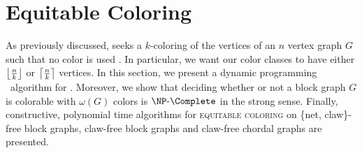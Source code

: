 \section{Equitable Coloring}

As previously discussed,  seeks a $k$-coloring of the vertices of an $n$ vertex graph $G$ such that no color is used . In particular, we want our color classes to have either $\left\lfloor\frac{n}{k}\right\rfloor$ or $\left\lceil\frac{n}{k}\right\rceil$ vertices.
In this section, we present a dynamic programming \XP\ algorithm for .
Moreover, we show that deciding whether or not a block graph $G$ is colorable with $\omega(G)$ colors is $\NPc$ in the strong sense.
Finally, constructive, polynomial time algorithms for \textsc{equitable coloring} on \{net, claw\}-free block graphs, claw-free block graphs and claw-free chordal graphs are presented.